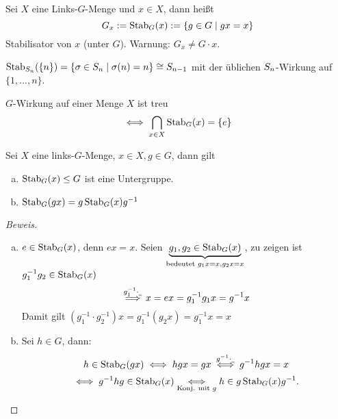 \documentclass[a4paper]{report}
\begin{document}
\begin{defi}
  Sei $X$ eine Links-$G$-Menge und $x \in X$, dann heißt
  \[G_{x} := \operatorname{Stab}_{G}(x) := \{g \in G \mid gx = x\}\]
  Stabilisator von $x$ (unter $G$).
  Warnung: $G_{x} \ne G\cdot x$.
\end{defi}
\begin{bsp*}
  $\operatorname{Stab}_{S_n}(\{n\}) = \{\sigma \in S_n \mid \sigma(n) = n\} \cong S_{n-1}$ mit der üblichen $S_n$-Wirkung auf $\{1, ..., n\}$.
\end{bsp*}
\begin{ubng*}
  $G$-Wirkung auf einer Menge $X$ ist treu
  \[\iff \bigcap_{x \in X} \operatorname{Stab}_{G}(x) = \{e\}\]
\end{ubng*}
\begin{prop}
  Sei $X$ eine links-$G$-Menge, $x \in X, g \in G$, dann gilt
  \begin{enumerate}[(a)]
    \item $\operatorname{Stab}_{G}(x) \le G$ ist eine Untergruppe.
    \item $\operatorname{Stab}_{G}(gx) = g\operatorname{Stab}_{G}(x)g^{-1}$
  \end{enumerate}
\end{prop}
\begin{proof}[Beweis] \item
  \begin{enumerate}[(a)]
    \item $e \in \operatorname{Stab}_{G}(x)$, denn $ex = x$. Seien $\underbrace{g_{1}, g_{2} \in \operatorname{Stab}_{G}(x)}_{\substack{\text{bedeutet } g_{1}x = x, g_{2} x= x}}$, zu zeigen ist $g_{1}^{-1}g_{2} \in \operatorname{Stab}_{G}(x)$
          \[\overset{g_{1}^{-1}\cdot \underline\ }{\implies} x = ex = g_{1}^{-1}g_{1}x = g^{-1}x\]
          Damit gilt $(g_{1}^{-1}\cdot g_{2}^{-1})x = g_{1}^{-1}(g_{2}x) = g_{1}^{-1}x = x$
    \item Sei $h \in G$, dann:
          \[h \in \operatorname{Stab}_{G}(gx) \iff hgx = gx \overset{g^{-1}\cdot \underline\ } \iff g^{-1}hgx = x \]
          \[ \iff g^{-1}hg \in \operatorname{Stab}_{G}(x) \underset{\text{Konj. mit } g} \iff h \in g \operatorname{Stab}_{G}(x)g^{-1}. \qedhere\]
  \end{enumerate}
\end{proof}
\end{document}
